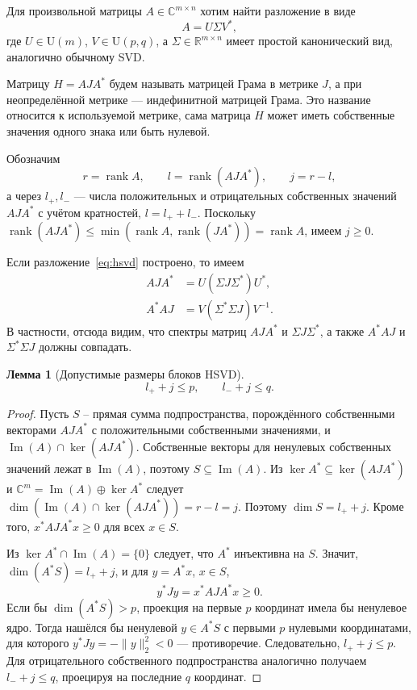 \documentclass[a4paper,12pt]{article}
\DeclareMathOperator{\rank}{rank}
\theoremstyle{csstyle}
\newtheorem{lemma}[theorem]{Лемма}
\DeclareMathOperator{\im}{Im}
\newcommand{\R}{\mathbb R}
\newcommand{\HSVDComplex}{\mathbb C}
\begin{document}
Для произвольной матрицы $A\in\HSVDComplex^{m\times n}$ хотим найти разложение в виде
\begin{equation}\label{eq:hsvd}
A=U\Sigma V^*,
\end{equation}
где $U\in \mathrm{U}(m)$, $V\in\mathrm{U}(p, q)$, а
$\Sigma\in\R^{m\times n}$ имеет простой канонический вид,
аналогично обычному SVD.

Матрицу $H=AJA^*$ будем называть матрицей Грама в метрике $J$,
а при неопределённой метрике --- индефинитной матрицей Грама.
Это название относится к используемой метрике, сама матрица $H$
может иметь собственные значения одного знака или быть нулевой.

Обозначим
\[
r=\rank A,\qquad l=\rank(AJA^*),\qquad j=r-l,
\]
а через $l_+,l_-$ --- числа положительных и отрицательных
собственных значений $AJA^*$ с учётом кратностей, $l=l_++l_-$.
Поскольку $\rank(AJA^*)\le \min(\rank A, \rank(JA^*)) = \rank A$, имеем $j\ge0$.

Если разложение~\eqref{eq:hsvd} построено, то имеем
\begin{equation}\label{eq:similarities}
\begin{aligned}
AJA^*&=U(\Sigma J\Sigma^*)U^*,\\
A^*AJ&=V(\Sigma^*\Sigma J)V^{-1}.
\end{aligned}
\end{equation}
В частности, отсюда видим, что спектры матриц $AJA^*$ и $\Sigma J \Sigma^*$, а также $A^*AJ$ и $\Sigma^*\Sigma J$ должны совпадать.


\begin{lemma}[Допустимые размеры блоков HSVD]\label{lem:signs}
\[
l_++j\le p,\qquad l_-+j\le q.
\]
\end{lemma}
\begin{proof}
Пусть $S$ -- прямая сумма подпространства,
порождённого собственными векторами $AJA^*$ с положительными
собственными значениями, и $\im(A)\cap\ker(AJA^*)$.
Собственные векторы для ненулевых собственных значений лежат в $\im(A)$,
поэтому $S\subseteq\im(A)$.
Из $\ker A^*\subseteq\ker(AJA^*)$ и
$\HSVDComplex^m=\im(A)\oplus\ker A^*$ следует
$\dim(\im(A)\cap\ker(AJA^*))=r-l=j$.
Поэтому $\dim S=l_++j$. Кроме того,
$x^*AJA^*x\ge0$ для всех $x\in S$.

Из $\ker A^*\cap\im(A)=\{0\}$ следует, что $A^*$ инъективна на $S$.
Значит, $\dim(A^*S)=l_++j$, и для $y=A^*x$, $x\in S$,
\[
y^*Jy=x^*AJA^*x\ge0.
\]
Если бы $\dim(A^*S)>p$, проекция на первые $p$ координат имела бы
ненулевое ядро. Тогда нашёлся бы ненулевой $y\in A^*S$
с первыми $p$ нулевыми координатами, для которого
$y^*Jy=-\|y\|_2^2<0$ --- противоречие.
Следовательно, $l_++j\le p$.
Для отрицательного собственного подпространства аналогично получаем
$l_-+j\le q$, проецируя на последние $q$ координат.
\end{proof}
\end{document}
